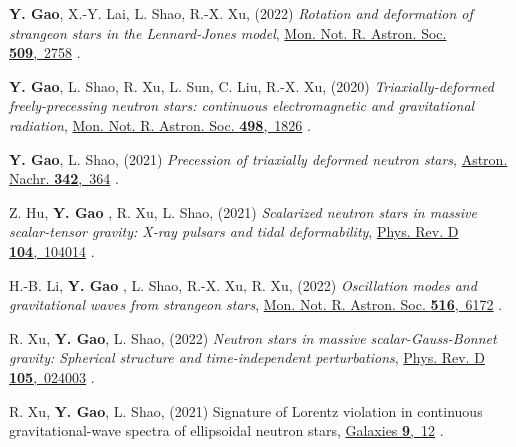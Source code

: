 \begin{etaremune}
\item
  {\bf Y. Gao}, 
  X.-Y. Lai, 
  L. Shao, 
  R.-X. Xu,
  (2022)
  {\it Rotation and deformation of strangeon stars in the Lennard-Jones model}, 
  \href{https://doi.org/10.1093/mnras/stab3181}{Mon. Not. R. Astron. Soc. {\bf 509},~2758}
  .
\item 
  {\bf Y. Gao}, 
  L. Shao, 
  R. Xu, 
  L. Sun, 
  C. Liu, 
  R.-X. Xu,
  (2020) 
  {\it Triaxially-deformed freely-precessing neutron stars: continuous electromagnetic and gravitational radiation}, 
  \href{https://doi.org/10.1093/mnras/staa2476}{Mon. Not. R. Astron. Soc. {\bf 498},~1826}
  .
\item 
  {\bf Y. Gao}, 
  L. Shao,
  (2021) 
  {\it Precession of triaxially deformed neutron stars}, 
  \href{https://doi.org/10.1002/asna.202113935}{Astron. Nachr. {\bf 342},~364}
  .
\item 
  Z. Hu, 
  {\bf Y. Gao },
  R. Xu, 
  L. Shao, 
  (2021)
  {\it Scalarized neutron stars in massive scalar-tensor gravity: X-ray pulsars and tidal deformability}, 
  \href{https://doi.org/10.1103/PhysRevD.104.104014}{Phys. Rev. D {\bf 104},~104014}
  .
\item
  H.-B. Li, 
  {\bf Y. Gao },
  L. Shao, 
  R.-X. Xu, 
  R. Xu, 
  (2022)
  {\it Oscillation modes and gravitational waves from strangeon stars},
  \href{https://academic.oup.com/mnras/advance-article-abstract/doi/10.1093/mnras/stac2622/6705433}{Mon. Not. R. Astron. Soc. {\bf 516},~6172}
  .
\item 
  R. Xu, 
  {\bf Y. Gao}, 
  L. Shao, 
  (2022)
  {\it Neutron stars in massive scalar-Gauss-Bonnet gravity: Spherical structure and time-independent perturbations}, 
  \href{https://doi.org/10.1103/PhysRevD.105.024003}{Phys. Rev. D {\bf 105},~024003}
  .
  \item 
  R. Xu, 
  {\bf Y. Gao}, 
  L. Shao, 
  (2021)
  Signature of Lorentz violation in continuous gravitational-wave spectra of ellipsoidal neutron stars, 
  \href{https://doi.org/10.3390/galaxies9010012}{Galaxies {\bf 9},~12}
  .  
  \setcounter{pubCounter}{\value{enumi}}


\end{etaremune}
